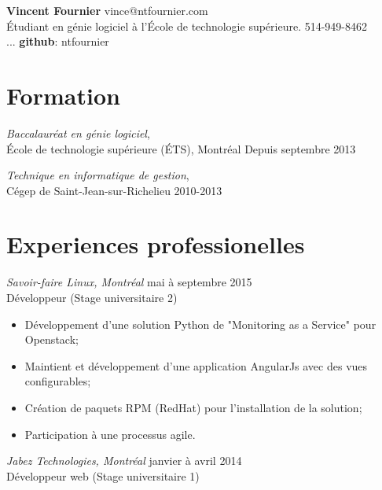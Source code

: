 \documentclass{res}
\begin{document}
\thispagestyle{empty} %

{\bf\huge Vincent Fournier}
\hfill vince@ntfournier.com \\
Étudiant en génie logiciel à l’École de technologie supérieure.
\hfill 514-949-8462 \\
...  \hfill \textbf {github}: ntfournier

\begin{resume}

\section{Formation}
\vspace{8pt}

{\sl Baccalauréat en génie logiciel}, \\
École de technologie supérieure (ÉTS), Montréal
\hfill Depuis septembre 2013


{\sl Technique en informatique de gestion}, \\
Cégep de Saint-Jean-sur-Richelieu
\hfill 2010-2013

\vspace{0.1in}

\section{Experiences professionelles}
\vspace{8pt}

{\sl Savoir-faire Linux, Montréal}
\hfill mai à septembre 2015 \\
Développeur \hfill (Stage universitaire 2)

\begin{itemize} \itemsep -2pt %
	\item Développement d'une solution Python de "Monitoring as a Service" pour Openstack;
	\item Maintient et développement d'une application AngularJs avec des vues configurables;
	\item Création de paquets RPM (RedHat) pour l'installation de la solution;
	\item Participation à une processus agile.
\end{itemize}


{\sl Jabez Technologies, Montréal}
\hfill janvier à avril 2014 \\
Développeur web \hfill (Stage universitaire 1)


\end{resume}
\end{document}
